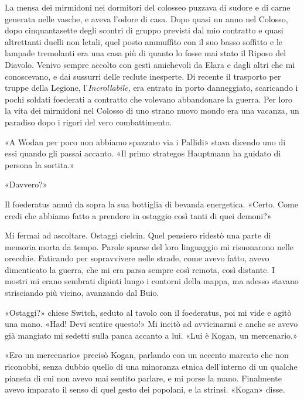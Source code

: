 \begin{figure}
	\centering
	\def\svgwidth{\columnwidth}
	\scalebox{0.2}{}
\end{figure}

La mensa dei mirmidoni nei dormitori del colosseo puzzava di sudore e di
carne generata nelle vasche, e aveva l'odore di casa. Dopo quasi un anno
nel Colosso, dopo cinquantasette degli scontri di gruppo previsti dal
mio contratto e quasi altrettanti duelli non letali, quel posto
ammuffito con il suo basso soffitto e le lampade tremolanti era una casa
più di quanto lo fosse mai stato il Riposo del Diavolo. Venivo sempre
accolto con gesti amichevoli da Elara e dagli altri che mi conoscevano,
e dai sussurri delle reclute inesperte. Di recente il trasporto per
truppe della Legione, l'\emph{Incrollabile,} era entrato in porto
danneggiato, scaricando i pochi soldati foederati a contratto che
volevano abbandonare la guerra. Per loro la vita dei mirmidoni nel
Colosso di uno strano nuovo mondo era una vacanza, un paradiso dopo i
rigori del vero combattimento.

«A Wodan per poco non abbiamo spazzato via i Pallidi» stava dicendo uno
di essi quando gli passai accanto. «Il primo strategos Hauptmann ha
guidato di persona la sortita.»

«Davvero?»

Il foederatus annuì da sopra la sua bottiglia di bevanda energetica.
«Certo. Come credi che abbiamo fatto a prendere in ostaggio così tanti
di quei demoni?»

Mi fermai ad ascoltare. Ostaggi cielcin. Quel pensiero ridestò una parte
di memoria morta da tempo. Parole sparse del loro linguaggio mi
risuonarono nelle orecchie. Faticando per {sopravvivere} nelle strade,
come avevo fatto, avevo dimenticato la guerra, che mi era parsa sempre
così remota, così distante. I mostri mi erano sembrati dipinti lungo i
contorni della mappa, ma adesso stavano strisciando più vicino,
avanzando dal Buio.

«Ostaggi?» chiese Switch, seduto al tavolo con il foederatus, poi mi
vide e agitò una mano. «Had! Devi sentire questo!» Mi incitò ad
avvicinarmi e anche se avevo già mangiato mi sedetti sulla panca accanto
a lui. «Lui è Kogan, un mercenario.»

«Ero un mercenario» precisò Kogan, parlando con un accento marcato che
non riconobbi, senza dubbio quello di una minoranza etnica dell'interno
di un qualche pianeta di cui non avevo mai sentito parlare, e mi porse
la mano. Finalmente avevo imparato il senso di quel gesto dei popolani,
e la strinsi. «Kogan» disse.

